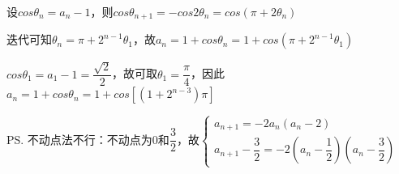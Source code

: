 \begin{enumerate}
\begin{jieda}
        设$cos\theta_n = a_n - 1$，则$cos\theta_{n+1} = -cos2\theta_n = cos(\pi+2\theta_n)$

        迭代可知$\theta_n = \pi + 2^{n-1}\theta_1$，故$a_n = 1+cos\theta_n = 1+cos(\pi + 2^{n-1}\theta_1)$

        $cos\theta_1 = a_1-1 = \dfrac{\sqrt{2}}{2}$，故可取$\theta_1 = \dfrac{\pi}{4}$，因此$a_n = 1+cos\theta_n = 1+cos[(1+2^{n-3})\pi]$

        \ps 不动点法不行：不动点为0和$\dfrac{3}{2}$，故$\left\{\begin{array}{l}
            a_{n+1} = -2a_n(a_n-2) \\
            a_{n+1}-\dfrac{3}{2} = -2\left(a_n-\dfrac{1}{2}\right)\left(a_n-\dfrac{3}{2}\right)
        \end{array}\right.$
    \end{jieda}
\end{enumerate}
